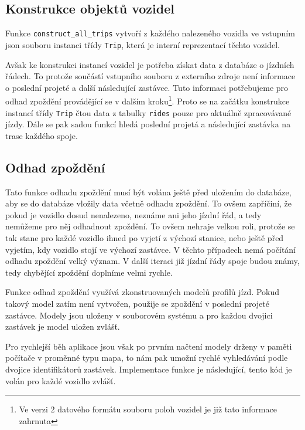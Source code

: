 \subsection{Konstrukce objektů vozidel}


Funkce \verb-construct_all_trips- vytvoří z každého nalezeného vozidla ve vstupním \gls{json} souboru instanci třídy \verb-Trip-, která je interní reprezentací těchto vozidel.


\bigbreak


Avšak ke konstrukci instancí vozidel je potřeba získat data z databáze o jízdních řádech. To protože součástí vstupního souboru z externího zdroje není informace o poslední projeté a další následující zastávce. Tuto informaci potřebujeme pro odhad zpoždění provádějící se v dalším kroku\footnote{Ve verzi 2 datového formátu souboru poloh vozidel je již tato informace zahrnuta}. Proto se na začátku konstrukce instancí třídy \verb-Trip- čtou data z tabulky \verb-rides- pouze pro aktuálně zpracovávané jízdy. Dále se pak sadou funkcí hledá poslední projetá a následující zastávka na trase každého spoje.


\subsection{Odhad zpoždění}


Tato funkce odhadu zpoždění musí být volána ještě před uložením do databáze, aby se do databáze vložily data včetně odhadu zpoždění. To ovšem zapříčiní, že pokud je vozidlo dosud nenalezeno, neznáme ani jeho jízdní řád, a tedy nemůžeme pro něj odhadnout zpoždění. To ovšem nehraje velkou roli, protože se tak stane pro každé vozidlo ihned po vyjetí z výchozí stanice, nebo ještě před vyjetím, kdy vozidlo stojí ve výchozí zastávce. V těchto případech nemá počítání odhadu zpoždění velký význam. V další iteraci již jízdní řády spoje budou známy, tedy chybějící zpoždění doplníme velmi rychle.


\bigbreak


Funkce odhad zpoždění využívá zkonstruovaných modelů profilů jízd. Pokud takový model zatím není vytvořen, použije se zpoždění v poslední projeté zastávce. Modely jsou uloženy v souborovém systému a pro každou dvojici zastávek je model uložen zvlášť.


\bigbreak


Pro rychlejší běh aplikace jsou však po prvním načtení modely drženy v paměti počítače v proměnné typu mapa, to nám pak umožní rychlé vyhledávání podle dvojice identifikátorů zastávek. Implementace funkce je následující, tento kód je volán pro každé vozidlo zvlášť.


